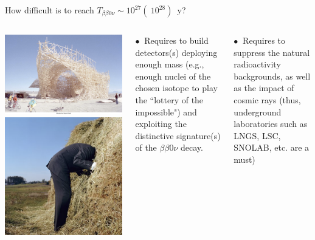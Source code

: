 \documentclass [aspectratio=169]{beamer}
\begin{document}

\begin{frame}{How difficult is to reach $T_{\beta\beta0\nu} \sim 10^{27} (~10^{28})$~y?}

\begin{columns}
\includegraphics[scale=0.23]{strawdet.png}
\includegraphics[scale=0.30]{pajar.png}

$\bullet~$ Requires to build detectors(s) deploying enough mass (e.g., enough nuclei of the chosen isotope to play the ``lottery of the impossible") and exploiting the distinctive signature(s) of the $\beta\beta0\nu$ decay. 

$\bullet~$ Requires to suppress the natural radioactivity backgrounds, as well as the impact of cosmic rays (thus, underground laboratories such as LNGS, LSC, SNOLAB, etc. are a must)

\end{columns}
\end{frame}
\end{document}
